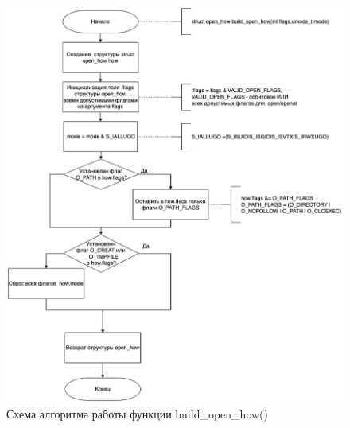 \begin{figure}[h!]
	\begin{center}
		\includegraphics[width=\textwidth]{images/build_open_how}
	\end{center}
	\caption{Схема алгоритма работы функции build\_open\_how() }
	\label{img:open_how}
\end{figure}


